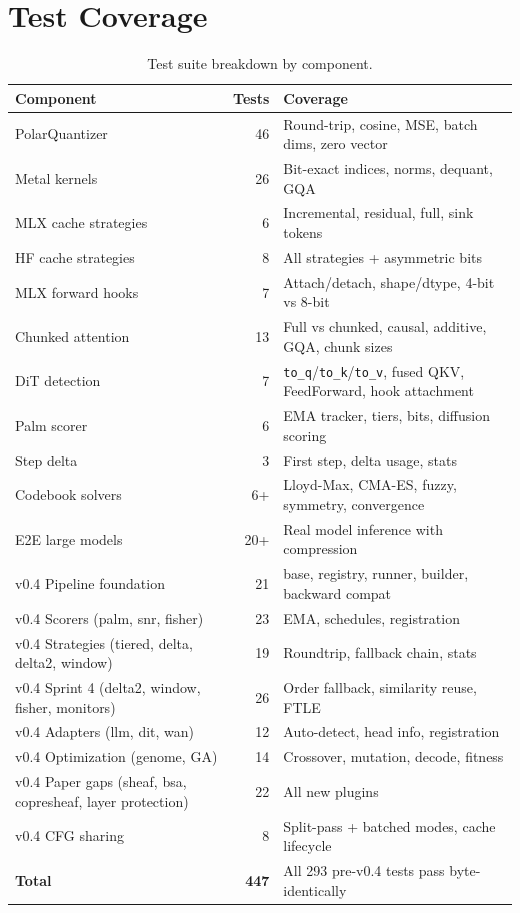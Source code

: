 \documentclass[11pt,a4paper]{article}
\begin{document}
\section{Test Coverage}

\begin{table}[h]
\centering
\caption{Test suite breakdown by component.}
\label{tab:test-coverage}
\begin{tabular}{lrl}
\toprule
\textbf{Component} & \textbf{Tests} & \textbf{Coverage} \\
\midrule
PolarQuantizer     & 46  & Round-trip, cosine, MSE, batch dims, zero vector \\
Metal kernels      & 26  & Bit-exact indices, norms, dequant, GQA \\
MLX cache strategies & 6 & Incremental, residual, full, sink tokens \\
HF cache strategies & 8  & All strategies + asymmetric bits \\
MLX forward hooks  & 7   & Attach/detach, shape/dtype, 4-bit vs 8-bit \\
Chunked attention  & 13  & Full vs chunked, causal, additive, GQA, chunk sizes \\
DiT detection      & 7   & \texttt{to\_q}/\texttt{to\_k}/\texttt{to\_v}, fused QKV, FeedForward, hook attachment \\
Palm scorer        & 6   & EMA tracker, tiers, bits, diffusion scoring \\
Step delta         & 3   & First step, delta usage, stats \\
Codebook solvers   & 6+  & Lloyd-Max, CMA-ES, fuzzy, symmetry, convergence \\
E2E large models   & 20+ & Real model inference with compression \\
\midrule
v0.4 Pipeline foundation     & 21 & base, registry, runner, builder, backward compat \\
v0.4 Scorers (palm, snr, fisher) & 23 & EMA, schedules, registration \\
v0.4 Strategies (tiered, delta, delta2, window) & 19 & Roundtrip, fallback chain, stats \\
v0.4 Sprint 4 (delta2, window, fisher, monitors) & 26 & Order fallback, similarity reuse, FTLE \\
v0.4 Adapters (llm, dit, wan) & 12 & Auto-detect, head info, registration \\
v0.4 Optimization (genome, GA) & 14 & Crossover, mutation, decode, fitness \\
v0.4 Paper gaps (sheaf, bsa, copresheaf, layer protection) & 22 & All new plugins \\
v0.4 CFG sharing & 8 & Split-pass + batched modes, cache lifecycle \\
\textbf{Total} & \textbf{447} & All 293 pre-v0.4 tests pass byte-identically \\
\bottomrule
\end{tabular}
\end{table}
\end{document}
